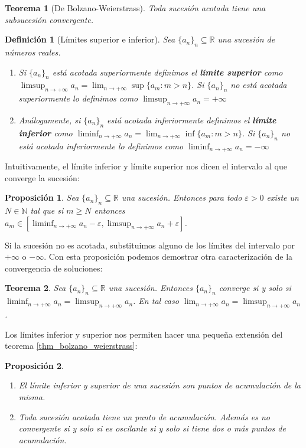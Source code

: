\documentclass{article}
\newtheorem{theorem}{Teorema}
\newtheorem{prop}{Proposición}
\newtheorem{define}{Definición}
\newcommand{\reales}{\mathbb{R}}
\newcommand{\naturales}{\mathbb{N}}
\newcommand{\sucesion}[1]{\{ #1 _n \}_n}
\newcommand{\sucreal}[1]{\{ #1 _n \}_n \subseteq \reales}
\newcommand{\limitesup}[1]{\limsup_{n\rightarrow +\infty} #1 _n}
\newcommand{\limiteinf}[1]{\liminf_{n\rightarrow +\infty} #1 _n}
\newcommand{\limiten}[1]{\lim_{n \rightarrow +\infty} #1}
\begin{document}
\begin{theorem}[De Bolzano-Weierstrass]
\label{thm_bolzano_weierstrass}
	Toda sucesión acotada tiene una subsucesión convergente.
\end{theorem}

\begin{define}[Límites superior e inferior]
	Sea $\sucreal{a}$ una sucesión de números reales. 
	\begin{enumerate}
	\item
	Si $\sucesion{a}$ está acotada superiormente definimos el \textbf{límite superior} como $\limitesup{a} = \lim_{n \rightarrow +\infty} \sup\{ a_m : m > n\}$. Si $\sucesion{a}$ no está acotada superiormente lo definimos como $\limsup_{n\rightarrow +\infty} a_n = +\infty$
	\item
	Análogamente, si $\sucesion{a}$ está acotada inferiormente definimos el \textbf{límite inferior} como $\limiteinf{a} = \lim_{n \rightarrow +\infty} \inf\{ a_m : m > n\}$. Si $\sucesion{a}$ no está acotada inferiormente lo definimos como $\liminf_{n\rightarrow +\infty} a_n = -\infty$
	\end{enumerate}
\end{define}

Intuitivamente, el límite inferior y límite superior nos dicen el intervalo al que converge la sucesión:

\begin{prop}
	Sea $\sucreal{a}$ una sucesión. Entonces para todo $\varepsilon > 0$ existe un $N \in \naturales$ tal que si $m \geq N$ entonces $a_m \in [\limiteinf{a}-\varepsilon, \limitesup{a}+\varepsilon]$.
\end{prop}

Si la sucesión no es acotada, substituimos alguno de los límites del intervalo por $+\infty$ o $-\infty$.
Con esta proposición podemos demostrar otra caracterización de la convergencia de soluciones:

\begin{theorem}
	Sea $\sucreal{a}$ una sucesión. Entonces $\sucesion{a}$ converge si y solo si $\limiteinf{a} = \limitesup{a}$. En tal caso $\limiten{a_n} = \limitesup{a}$.
\end{theorem}

Los límites inferior y superior nos permiten hacer una pequeña extensión del teorema \eqref{thm_bolzano_weierstrass}:
\begin{prop}
\begin{enumerate}
\item
	El límite inferior y superior de una sucesión son puntos de acumulación de la misma.
\item
	Toda sucesión acotada tiene un punto de acumulación. Además es no convergente si y solo si es oscilante si y solo si tiene dos o más puntos de acumulación.
\end{enumerate}
\end{prop}
\end{document}

